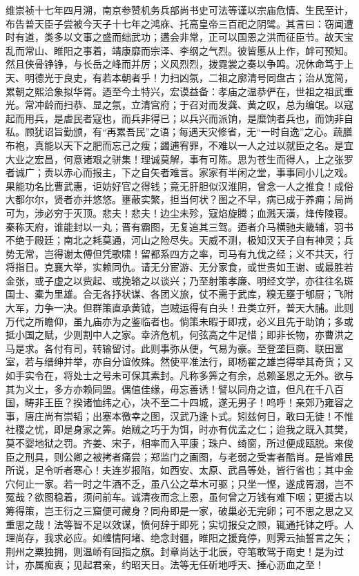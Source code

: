 \documentclass[]{article}
\begin{document}
维崇祯十七年四月溯，南京参赞机务兵部尚书史可法等谨以宗庙危情、生民至计，布告普天臣子尝被今天子十七年之鸿庥、托高皇帝三百祀之阴骘。其言曰：窃闻遭时有道，类多以文事之盛而绌武功；遘会非常，正可以国恩之洪而征臣节。故天宝乱而常山、睢阳之事着，靖康靡而宗泽、李纲之气烈。彼皆慝从上作，衅可预知。然且侠骨铮铮，与长岳之峰而并厉；义风烈烈，拨霓裳之奏以争鸣。况休命笃于上天、明德光于良史，有若本朝者乎！力扫凶氛，二祖之廓清号同盘古；治从宽简，累朝之熙洽象拟华胥。迺至今土特兴，宏谟益备：孝庙之温恭俨在，世祖之祖武重光。常冲龄而扫恭、显之氛，立清宫府；于召对而发龚、黄之叹，总为编氓。以寇起而用兵，是虐民者寇也，而兵非得已；以兵兴而派饷，是糜饷者兵也，而饷非自私。顾犹诏旨勤颁，有``再累吾民''之语；每遇天灾修省，无``一时自逸''之心。蔬膳布袍，真能以天下之肥而忘己之瘦；蠲逋宥罪，不难以一人之过以就臣之名。是宜大业之宏昌，何意诸艰之骈集！理诚莫解，事有可陈。思为苍生而得人，上之张罗者诚广；责以赤心而报主，下之自矢者难言。家家有半闲之堂，事事同小儿之戏。果能功名比曹武惠，讵妨好官之得钱；竟无肝胆似汉淮阴，曾念一人之推食！成俗大都尔尔，贤者亦并悠悠。壅蔽实繁，担当何状？图之不早，病已成于养痈；局尚可为，涉必穷于灭顶。悲夫！悲夫！边尘未殄，寇焰旋腾；血溅天潢，烽传陵寝。秦称天府，谁能封以一丸；晋有霸图，无复追其三驾。迺者介马横驰夫畿辅，羽书不绝于殿廷；南北之耗莫通，河山之险尽失。天威不测，极知汉天子自有神灵；兵势无常，岂得谢太傅但凭歌啸！留都系四方之率，司马有九伐之经；义不共天，行将指日。克襄大举，实赖同仇。请无分宦游、无分家食，或世贵如王谢、或最胜若金张，或子虚之以赀起、或挽辂之以谈兴；乃至射策孝廉、明经文学，亦往往名斑国士、橐为里雄。合无各抒状谋、各团义旅，仗不需于武库，糗无壅于郇厨；飞附大军，力争一决。但群策直承黄钺，岂贼运得有白头！丑类立歼，普天大脯。此则万代之所瞻仰，虽九庙亦为之鉴临者也。倘策未暇于即戎，必义且先于助饷；多或抵小国之赋，少则割中人之家。幸济危机，何弦高之牛足惜；即非长物，亦曹洪之马是求。各付有司，转输留讨。此则事弥从便，气易为豪。至登垄巨商、联田富室，若与缙绅并举，亦自分谊攸殊。然使平准法行，即杨翟之雄岂得举其奇货；又如手实令在，将处士之号未可保其素封。凡称多筭之有余，总赖圣恩之无外。欲与其为义士，多方亦赖同盟。偶值佳缘，毋忘善诱！譬以同舟之谊，但凡在千八百国，畴非王臣？揆诸恤纬之心，决不至二十四城，遂无男子！呜呼！亲郊乃雍容之事，唐庄尚有崇韬；出塞本徼幸之图，汉武乃逢卜式。矧兹何日，敢曰无徒！不惟社稷之忧，即是身家之筭。始贼之巧于为饵，时亦有优孟之仁；迨我之既入其樊，莫不婴地狱之罚。齐姜、宋子，相率而入平康；珠户、绮窗，所过便成瓯脱。来俊臣之刑具，则公卿之被拷者痛尝；郑监门之画图，与老弱之受害者酷肖。是皆难民所说，足令听者寒心！夫连岁报陷，如西安、太原、武昌等处，皆行省也；其中金穴何止一家。若一时之牛酒不乏，虽八公之草木可驱；只坐一悭，遂成胥溺，岂不冤哉？欲图稳着，须问前车。诚清夜而念上恩，虽何曾之万钱有难下咽；更援古以筹得策，岂王衍之三窟便可藏身？同舟即是一家，破巢必无完卵；可不思之思之又重思之哉！法等智不足以效谋，愤何辞于即死；实切报殳之顾，辄通托钵之呼。人理尚存，我求必应。如缠情阿堵、绝念封疆，睢阳之援竟停，则霁云抽誓言之矢；荆州之粟独拥，则温峤有回指之旗。封章尚达于北辰，夺笔敢驾于南史！是为过计，亦属痴衷；见起君亲，约昭天日。法等无任斫地呼天、捶心沥血之至！
\end{document}
